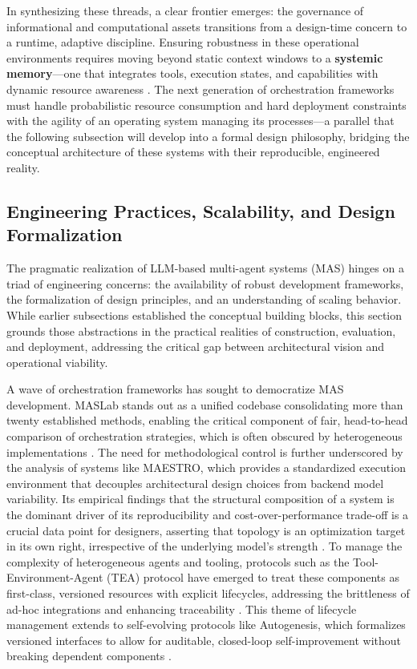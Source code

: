 \documentclass[11pt,a4paper]{article}
\begin{document}
In synthesizing these threads, a clear frontier emerges: the governance of informational and computational assets transitions from a design-time concern to a runtime, adaptive discipline. Ensuring robustness in these operational environments requires moving beyond static context windows to a \textbf{systemic memory}---one that integrates tools, execution states, and capabilities with dynamic resource awareness \cite{arxiv:2603.10062v2}. The next generation of orchestration frameworks must handle probabilistic resource consumption and hard deployment constraints with the agility of an operating system managing its processes---a parallel that the following subsection will develop into a formal design philosophy, bridging the conceptual architecture of these systems with their reproducible, engineered reality.


\subsection{Engineering Practices, Scalability, and Design Formalization}


The pragmatic realization of LLM-based multi-agent systems (MAS) hinges on a triad of engineering concerns: the availability of robust development frameworks, the formalization of design principles, and an understanding of scaling behavior. While earlier subsections established the conceptual building blocks, this section grounds those abstractions in the practical realities of construction, evaluation, and deployment, addressing the critical gap between architectural vision and operational viability.

A wave of orchestration frameworks has sought to democratize MAS development. MASLab stands out as a unified codebase consolidating more than twenty established methods, enabling the critical component of fair, head-to-head comparison of orchestration strategies, which is often obscured by heterogeneous implementations \cite{arxiv:2505.16988v2}. The need for methodological control is further underscored by the analysis of systems like MAESTRO, which provides a standardized execution environment that decouples architectural design choices from backend model variability. Its empirical findings that the structural composition of a system is the dominant driver of its reproducibility and cost-over-performance trade-off is a crucial data point for designers, asserting that topology is an optimization target in its own right, irrespective of the underlying model's strength \cite{arxiv:2601.00481v1}. To manage the complexity of heterogeneous agents and tooling, protocols such as the Tool-Environment-Agent (TEA) protocol have emerged to treat these components as first-class, versioned resources with explicit lifecycles, addressing the brittleness of ad-hoc integrations and enhancing traceability \cite{arxiv:2506.12508v6}. This theme of lifecycle management extends to self-evolving protocols like Autogenesis, which formalizes versioned interfaces to allow for auditable, closed-loop self-improvement without breaking dependent components \cite{arxiv:2604.15034v5}.
\end{document}
